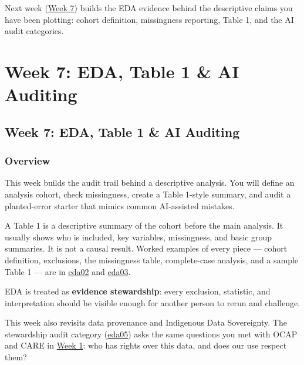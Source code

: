 \documentclass[
  letterpaper,
  DIV=11,
  numbers=noendperiod,
  oneside]{scrreprt}
\begin{document}

Next week (\href{../week07-eda-ai-audit/index.qmd}{Week 7}) builds the
EDA evidence behind the descriptive claims you have been plotting:
cohort definition, missingness reporting, Table 1, and the AI audit
categories.

\part{Week 7: EDA, Table 1 \& AI Auditing}

\chapter*{Week 7: EDA, Table 1 \& AI
Auditing}\label{week-7-eda-table-1-ai-auditing-1}


\section*{Overview}\label{overview-6}


This week builds the audit trail behind a descriptive analysis. You will
define an analysis cohort, check missingness, create a Table 1-style
summary, and audit a planted-error starter that mimics common
AI-assisted mistakes.

A Table 1 is a descriptive summary of the cohort before the main
analysis. It usually shows who is included, key variables, missingness,
and basic group summaries. It is not a causal result. Worked examples of
every piece --- cohort definition, exclusions, the missingness table,
complete-case analysis, and a sample Table 1 --- are in
\href{eda02-cohort-and-missingness.qmd}{eda02} and
\href{eda03-worked-example.qmd}{eda03}.

EDA is treated as \textbf{evidence stewardship}: every exclusion,
statistic, and interpretation should be visible enough for another
person to rerun and challenge.

This week also revisits data provenance and Indigenous Data Sovereignty.
The stewardship audit category
(\href{eda05-ai-audit-categories.qmd}{eda05}) asks the same questions
you met with OCAP and CARE in
\hyperref[indigenous-data-sovereignty]{Week 1}: who has rights over this
data, and does our use respect them?
\end{document}
